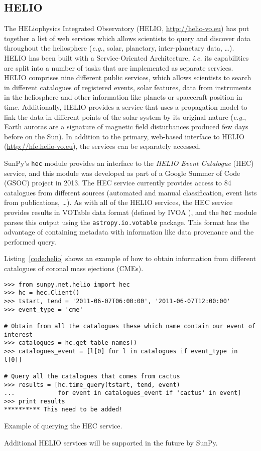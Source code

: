 \subsection{HELIO}\label{ssec:helio}

The HELiophysics Integrated Observatory 
(HELIO, \url{http://helio-vo.eu}) has put together a list of web 
services which allows scientists to query and discover data throughout 
the heliosphere (\textit{e.g.}, solar, planetary, inter-planetary data, 
\ldots)\citep{dps2012}.
HELIO has been built with a Service-Oriented Architecture, 
\textit{i.e.} its capabilities are split into a number of tasks that are 
implemented as separate services. 
HELIO comprises nine different public services, which allows scientists
to search in different catalogues of registered events, solar features,
data from instruments in the heliosphere and other information like planets or 
spacecraft position in time. 
Additionally, HELIO provides a service that uses a propagation model to link 
the data in different points of the solar system by its original nature 
(\textit{e.g.}, Earth auroras are a signature of magnetic field disturbances 
produced few days before on the Sun).
In addition to the primary, web-based interface to HELIO
(\url{http://hfe.helio-vo.eu}), the services can be separately accessed.

SunPy's \texttt{hec} module provides an interface to the
\textit{HELIO Event Catalogue} (HEC) service, and this module was developed as
part of a Google Summer of Code (GSOC) project in 2013.
The HEC service currently provides access to 84 catalogues from different
sources (automated and manual classification, event lists from publications, \ldots).
As with all of the HELIO services, the HEC service provides results in VOTable 
data format (defined by IVOA \cite{ochsenbein_ivoa_2011}), and the \texttt{hec}
module parses this output using the \texttt{astropy.io.votable} package.
This format has the advantage of containing metadata with information like
data provenance and the performed query.

Listing~\ref{code:helio} shows an example of how to obtain information
from different catalogues of coronal mass ejections (CMEs).

\begin{listing}[h]
\begin{verbatim}
>>> from sunpy.net.helio import hec
>>> hc = hec.Client()
>>> tstart, tend = '2011-06-07T06:00:00', '2011-06-07T12:00:00'
>>> event_type = 'cme'

# Obtain from all the catalogues these which name contain our event of interest
>>> catalogues = hc.get_table_names()
>>> catalogues_event = [l[0] for l in catalogues if event_type in l[0]]

# Query all the catalogues that comes from cactus
>>> results = [hc.time_query(tstart, tend, event) 
...            for event in catalogues_event if 'cactus' in event]
>>> print results
********** This need to be added!
\end{verbatim}
\caption{Example of querying the HEC service.}
\label{code:helio}
\end{listing}

Additional HELIO services will be supported in the future by SunPy.
